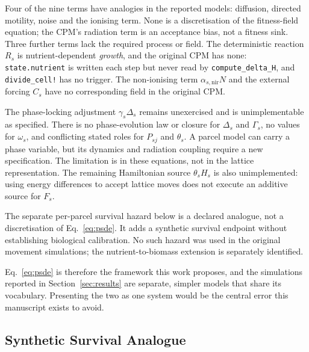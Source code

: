 \documentclass[11pt]{article}
\begin{document}
Four of the nine terms have analogies in the reported models: diffusion, directed motility,
noise and the ionising term. None is a discretisation of the fitness-field equation; the
CPM's radiation term is an acceptance bias, not a fitness sink. Three further terms lack
the required process or field. The deterministic reaction $R_s$ is nutrient-dependent
\emph{growth}, and the original CPM has none:
\texttt{state.nutrient} is written each step but never read by \texttt{compute\_delta\_H}, and
\texttt{divide\_cell!} has no trigger. The non-ionising term $\alpha_{s,\mathrm{nir}}N$ and the
external forcing $C_s$ have no corresponding field in the original CPM.

The phase-locking adjustment $\gamma_s\Delta_s$ remains unexercised and is unimplementable as
specified. There is no phase-evolution law or closure for $\Delta_s$ and $\Gamma_s$, no values
for $\omega_s$, and conflicting stated roles for $P_{sj}$ and $\theta_s$. A parcel model can
carry a phase variable, but its dynamics and radiation coupling require a new specification.
The limitation is in these equations, not in the lattice representation. The remaining
Hamiltonian source $\theta_s H_s$ is also unimplemented: using energy differences to accept
lattice moves does not execute an additive source for $F_s$.

The separate per-parcel survival hazard below is a declared analogue, not a
discretisation of Eq.~\ref{eq:psde}. It adds a synthetic survival endpoint without
establishing biological calibration. No such hazard was used in the original movement
simulations; the nutrient-to-biomass extension is separately identified.

Eq.~\ref{eq:psde} is therefore the framework this work proposes, and the simulations reported in
Section~\ref{sec:results} are separate, simpler models that share its vocabulary. Presenting the
two as one system would be the central error this manuscript exists to avoid.

\subsection{Synthetic Survival Analogue}
\label{app:synthetic_survival}
\end{document}

